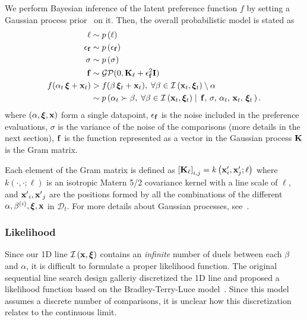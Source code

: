 We perform Bayesian inference of the latent preference function \(f\) by setting a Gaussian process prior~\cite{rasmussen_gaussian_2006} on it.
Then, the overall probabilistic model is stated as 
\begin{align}
\ell          &\sim p\,(\ell) \nonumber\\
\epsilon_{\vf} &\sim p\,(\epsilon_{\vf}) \nonumber\\
\sigma        &\sim p\,(\sigma) \nonumber\\
\vf           &\sim \mathcal{GP}(0, \mK_{\ell} + \epsilon_{\vf}^2\mI) \nonumber\\
 f(\alpha_t\,\vxi + \vx_t) &> f(\beta\,\vxi_t + \vx_t),\; \forall\beta \in \mathcal{I}\left(\vx_t,\vxi_t\right) \setminus \alpha \nonumber\\
%
&\sim p\left(\alpha_t \succ \beta,\; \forall \beta \in \mathcal{I}\left(\vx_t, \vxi_t\right) \mid\, \vf,\, \sigma,\, \alpha_t,\, \vx_t,\, \vxi_t\,\right).\nonumber
\end{align}
%
    {\noindent}where \((\alpha, \bm{\xi}, \mathbf{x})\) form a single datapoint, \(\epsilon_{\mathbf{f}}\) is the noise included in the preference evaluations, \(\sigma\) is the variance of the noise of the comparisons (more details in the next section), \(\mathbf{f}\) is the function represented as a vector in the Gaussian process \(\mathcal{\mathbf{K}}\) is the Gram matrix.

Each element of the Gram matrix is defined as
\(
  {[\mathbf{K}_{\ell}]}_{i,j} = k\left(\mathbf{x}^\prime_i, \mathbf{x}^\prime_j; \ell \right)
\)
where \(k\left(\cdot, \cdot; \ell \right)\) is an isotropic Matern 5/2 covariance kernel with a line scale of \(\ell\), and \({\mathbf{x}^\prime}_i, {\mathbf{x}^\prime}_j\) are the positions formed by all the combinations of the different \(\alpha, \beta^{(i)}, \bm{\xi}, \mathbf{x}\) in \(\mathcal{D}_t\).
For more details about Gaussian processes, see~\cite{rasmussen_gaussian_2006}.

\subsubsection{Likelihood}
Since our 1D line \(\mathcal{I}\left(\mathbf{x}, \bm{\xi}\right)\) contains an \textit{infinite} number of duels between each \(\beta\) and \(\alpha\), it is difficult to formulate a proper likelihood function.
The original sequential line search design galleriy discretized the 1D line and proposed a likelihood function based on the Bradley-Terry-Luce model~\cite{10.1145/3072959.3073598}.
Since this model assumes a discrete number of comparisons, it is unclear how this discretization relates to the continuous limit.

